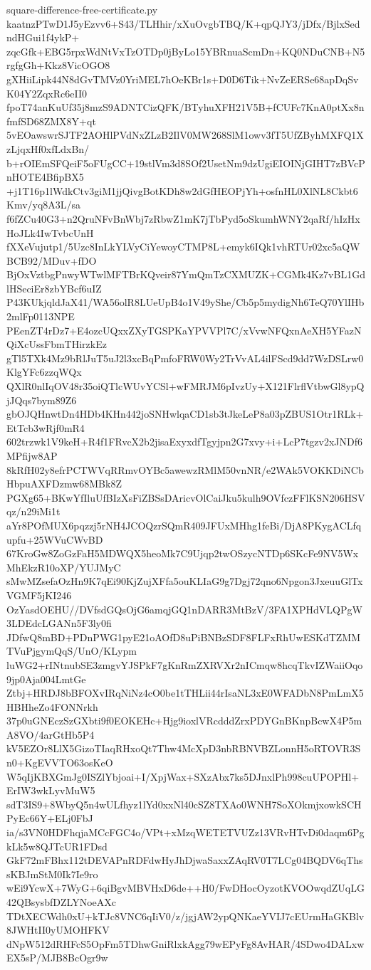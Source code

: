 \documentclass[11pt]{article}
\theoremstyle{definition}
\theoremstyle{remark}
\begin{document}
\begin{filecontents*}[overwrite]{square-difference-free-certificate.py}
kaatnzPTwD1J5yEzvv6+S43/TLHhir/xXuOvgbTBQ/K+qpQJY3/jDfx/BjlxSedndHGui1f4ykP+
zqcGfk+EBG5rpxWdNtVxTzOTDp0jByLo15YBRnuaScmDn+KQ0NDuCNB+N5rgfgGh+Kkz8VicOGO8
gXHiiLipk44N8dGvTMVz0YriMEL7hOeKBr1s+D0D6Tik+NvZeERSe68apDqSvK04Y2ZqxRc6eII0
fpoT74anKuUf35j8mzS9ADNTCizQFK/BTyhuXFH21V5B+fCUFc7KnA0ptXx8nfmfSD68ZMX8Y+qt
5vEOawswrSJTF2AOHlPVdNxZLzB2IlV0MW268SlM1owv3fT5UfZByhMXFQ1XzLjqxHf0xfLdxBn/
b+rOIEmSFQeiF5oFUgCC+19stlVm3d8SOf2UsetNm9dzUgiEIOINjGIHT7zBVcPnHOTE4BfipBX5
+j1T16p1lWdkCtv3giM1jjQivgBotKDh8w2dGfHEOPjYh+osfnHL0XlNL8Ckbt6Kmv/yq8A3L/sa
f6fZCu40G3+n2QruNFvBnWbj7zRbwZ1mK7jTbPyd5oSkumhWNY2qaRf/hIzHxHoJLk4IwTvbcUnH
fXXeVujutp1/5Uzc8InLkYLVyCiYewoyCTMP8L+emyk6IQk1vhRTUr02xc5aQWBCB92/MDuv+fDO
BjOxVztbgPnwyWTwlMFTBrKQveir87YmQmTzCXMUZK+CGMk4Kz7vBL1GdlHSeciEr8zbYBcf6uIZ
P43KUkjqldJaX41/WA56olR8LUeUpB4o1V49yShe/Cb5p5mydigNh6TeQ70YlIHb2mlFp0113NPE
PEenZT4rDz7+E4ozcUQxxZXyTGSPKaYPVVPl7C/xVvwNFQxnAeXH5YFazNQiXcUssFbmTHirzkEz
gTl5TXk4Mz9bRlJuT5uJ2l3xcBqPmfoFRW0Wy2TrVvAL4ilFScd9dd7WzDSLrw0KlgYFc6zzqWQx
QXlR0nlIqOV48r35oiQTlcWUvYCSl+wFMRJM6pIvzUy+X121FlrflVtbwGl8ypQjJQqs7bym89Z6
gbOJQHnwtDn4HDb4KHn442joSNHwlqaCD1sb3tJkeLeP8a03pZBUS1Otr1RLk+EtTcb3wRjf0mR4
602trzwk1V9keH+R4f1FRvcX2b2jisaExyxdfTgyjpn2G7xvy+i+LcP7tgzv2xJNDf6MPfijw8AP
8kRfH02y8efrPCTWVqRRmvOYBc5awewzRMlM50vnNR/e2WAk5VOKKDiNCbHbpuAXFDzmw68MBk8Z
PGXg65+BKwYfIluUfBIzXsFiZBSsDAricvOlCaiJku5kulh9OVfczFFlKSN206HSVqz/n29iMi1t
aYr8POfMUX6pqzzj5rNH4JCOQzrSQmR409JFUxMHhg1feBi/DjA8PKygACLfqupfu+25WVuCWvBD
67KroGw8ZoGzFaH5MDWQX5heoMk7C9Ujqp2twOSzycNTDp6SKcFe9NV5WxMhEkzR10oXP/YUJMyC
sMwMZsefaOzHn9K7qEi90KjZujXFfa5ouKLIaG9g7Dgj72qno6Npgon3JxeuuGlTxVGMF5jKI246
OzYasdOEHU//DVfsdGQsOjG6amqjGQ1nDARR3MtBzV/3FA1XPHdVLQPgW3LDEdcLGANn5F3ly0fi
JDfwQ8mBD+PDnPWG1pyE21oAOfD8uPiBNBzSDF8FLFxRhUwESKdTZMMTVuPjgymQqS/UnO/KLypm
luWG2+rINtnubSE3zmgvYJSPkF7gKnRmZXRVXr2nICmqw8hcqTkvIZWaiiOqo9jp0Aja004LmtGe
Ztbj+HRDJ8bBFOXvIRqNiNz4cO0be1tTHLii44rIsaNL3xE0WFADbN8PmLmX5HBHheZo4FONNrkh
37p0uGNEczSzGXbti9f0EOKEHc+Hjg9ioxlVRcdddZrxPDYGnBKnpBcwX4P5mA8VO/4arGtHb5P4
kV5EZOr8LlX5GizoTIaqRHxoQt7Thw4McXpD3nbRBNVBZLonnH5oRTOVR3Sn0+KgEVVTO63osKeO
W5qIjKBXGmJg0ISZlYbjoai+I/XpjWax+SXzAbx7ks5DJnxlPh998cuUPOPHl+ErIW3wkLyvMuW5
sdT3IS9+8WbyQ5n4wULfhyz1lYd0xxNl40cSZ8TXAo0WNH7SoXOkmjxowkSCHPyEc66Y+ELj0FbJ
ia/s3VN0HDFhqjaMCcFGC4o/VPt+xMzqWETETVUZz13VRvHTvDi0daqm6PgkLk5w8QJTcUR1FDsd
GkF72mFBhx112tDEVAPnRDFdwHyJhDjwaSaxxZAqRV0T7LCg04BQDV6qThssKBJmStM0Ik7Ie9ro
wEi9YcwX+7WyG+6qiBgvMBVHxD6de++H0/FwDHocOyzotKVOOwqdZUqLG42QBsysbfDZLYNoeAXc
TDtXECWdh0xU+kTJc8VNC6qIiV0/z/jgjAW2ypQNKaeYVIJ7cEUrmHaGKBlv8JWHtII0yUMOHFKV
dNpW512dRHFcS5OpFm5TDhwGniRlxkAgg79wEPyFg8AvHAR/4SDwo4DALxwEX5sP/MJB8BcOgr9w

\end{filecontents*}
\end{document}
